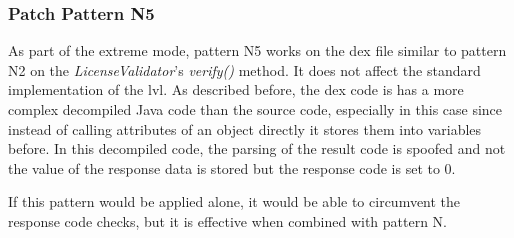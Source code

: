 \subsubsection{Patch Pattern N5}
As part of the extreme mode, pattern N5 works on the \gls{dex} file similar to pattern N2 on the \textit{LicenseValidator}'s \textit{verify()} method. It does not affect the standard implementation of the \gls{lvl}.
\newline
As described before, the dex code is has a more complex decompiled Java code than the source code, especially in this case since instead of calling attributes of an object directly it stores them into variables before.
In this decompiled code, the parsing of the result code is spoofed and not the value of the response data is stored but the response code is set to 0.
\newline


If this pattern would be applied alone, it would be able to circumvent the response code checks, but it is effective when combined with pattern N.


